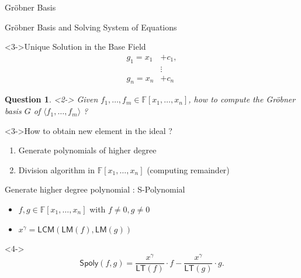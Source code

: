 \documentclass{beamer}
\newcommand{\Field}{\mathbb{F}}
\newcommand{\Ideal}[1]{\langle #1 \rangle}
\newcommand{\LT}[1]{\mathsf{LT}(#1)}
\newcommand{\LM}[1]{\mathsf{LM}(#1)}
\newcommand{\mpolyring}[3]{#1[#2_{1}, \ldots, #2_{#3}]}
\newcommand{\LCM}[2]{\mathsf{LCM}(#1, #2)}
\newcommand{\LCMLM}[2]{\LCM{\LM{#1}}{\LM{#2}}}
\newcommand{\Spoly}[2]{\mathsf{Spoly}(#1, #2)}
\newcommand{\Grobner}{Gr\"{o}bner }
\newtheorem{question}{Question}
\begin{document}
\begin{section}{\Grobner Basis}
\begin{frame}{\Grobner Basis and Solving System of Equations}
    \begin{block}<3->{Unique Solution in the Base Field}
      \begin{align*}
        g_1 = x_1 &+ c_1,\\
            &\vdots\\
        g_n = x_n &+ c_n
      \end{align*}
    \end{block}
  \end{frame}

  \begin{frame}
    \begin{question}<2->
      Given $f_1, \ldots, f_m \in \mpolyring{\Field}{x}{n}$, how to compute the \Grobner basis $G$ of $\Ideal{f_1, \ldots, f_m}$ ?
    \end{question}

    \begin{block}<3->{How to obtain new element in the ideal ?}
      \begin{enumerate}
      \item<4-> Generate polynomials of higher degree
      \item<5-> Division algorithm in $\mpolyring{\Field}{x}{n}$ (computing remainder)
      \end{enumerate}
    \end{block}
  \end{frame}

  \begin{frame}{Generate higher degree polynomial : S-Polynomial}
    \begin{itemize}
    \item<2-> $f, g \in \mpolyring{\Field}{x}{n}$ with $f \neq 0, g \neq 0$
    \item<3-> $x^{\gamma} = \LCMLM{f}{g}$
    \end{itemize}
    \begin{definition}<4->
      $$
      \Spoly{f}{g} = \dfrac{x^{\gamma}}{\LT{f}} \cdot f -
      \dfrac{x^{\gamma}}{\LT{g}} \cdot g.
      $$
    \end{definition}
  \end{frame}


\end{section}
\end{document}
